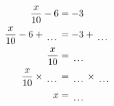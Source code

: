 \documentclass[varwidth]{standalone}
\begin{document}
    \begin{varwidth}{0.25\paperwidth}
    \begin{align*}
    \frac{x}{10} - 6 &= -3\\
    \frac{x}{10} - 6 + \dotuline{\hspace{5mm}} &= -3 + \dotuline{\hspace{5mm}}\\
    \frac{x}{10} &= \dotuline{\hspace{5mm}}\\
    \frac{x}{10} \times\dotuline{\hspace{5mm}} &= \dotuline{\hspace{5mm}} \times\dotuline{\hspace{5mm}}\\
    x &= \dotuline{\hspace{5mm}}\\
\end{align*}
\end{varwidth}
\end{document}
